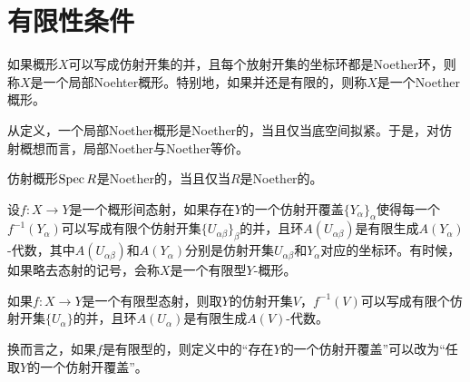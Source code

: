 \section{有限性条件}

\begin{para}[（局部）Noether概形]
	如果概形$X$可以写成仿射开集的并，且每个放射开集的坐标环都是Noether环，则称$X$是一个局部Noehter概形。特别地，如果并还是有限的，则称$X$是一个Noether概形。
\end{para}

从定义，一个局部Noether概形是Noether的，当且仅当底空间拟紧。于是，对仿射概想而言，局部Noether与Noether等价。

\begin{pro}
	仿射概形$\operatorname{Spec} R$是Noether的，当且仅当$R$是Noether的。
\end{pro}

\begin{para}[有限型态射]
	设$f:X\to Y$是一个概形间态射，如果存在$Y$的一个仿射开覆盖$\{Y_\alpha\}_\alpha$使得每一个$f^{-1}(Y_\alpha)$可以写成有限个仿射开集$\{U_{\alpha\beta}\}_\beta$的并，且环$A(U_{\alpha\beta})$是有限生成$A(Y_\alpha)$-代数，其中$A(U_{\alpha\beta})$和$A(Y_\alpha)$分别是仿射开集$U_{\alpha\beta}$和$Y_\alpha$对应的坐标环。有时候，如果略去态射的记号，会称$X$是一个有限型$Y$-概形。
\end{para}

\begin{pro}
	如果$f:X\to Y$是一个有限型态射，则取$Y$的仿射开集$V$，$f^{-1}(V)$可以写成有限个仿射开集$\{U_{\alpha}\}$的并，且环$A(U_{\alpha})$是有限生成$A(V)$-代数。
\end{pro}

换而言之，如果$f$是有限型的，则定义中的“存在$Y$的一个仿射开覆盖”可以改为“任取$Y$的一个仿射开覆盖”。

